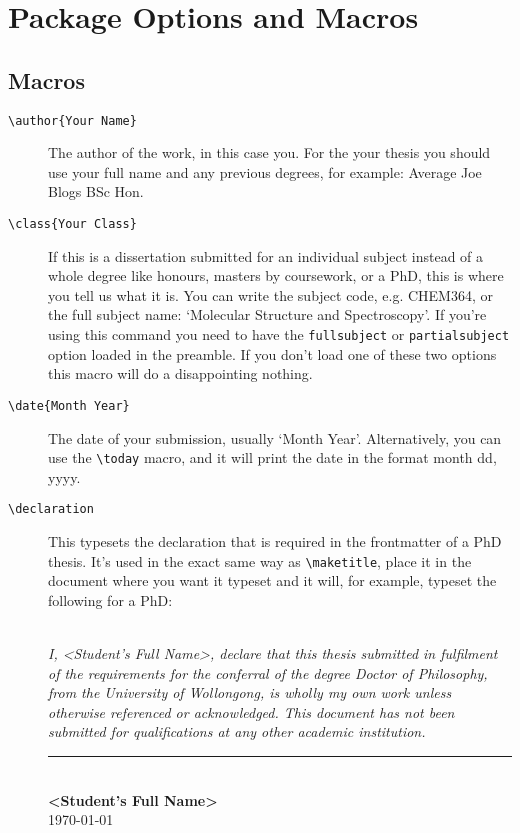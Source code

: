 \documentclass[12pt,oneside]{article}
\newcommand{\oporcom}[1]{\texttt{\color{Red}#1}} %
\newcommand{\comoptions}[1]{\texttt{\color{Green}#1}} %
\begin{document}
\section{Package Options and Macros}
\subsection*{Macros}
\begin{description}
    \item[\oporcom{\textbackslash{}author}\comoptions{\{Your Name\}}]
    The author of the work, in this case you. For the your thesis you should use your full name and any previous degrees, for example: Average Joe Blogs BSc Hon.
    
    \item[\oporcom{\textbackslash{}class}\comoptions{\{Your Class\}}] If this is a dissertation submitted for an individual subject instead of a whole degree like honours, masters by coursework, or a PhD, this is where you tell us what it is. You can write the subject code, e.g. CHEM364, or the full subject name: `Molecular Structure and Spectroscopy'. If you're using this command you need to have the \oporcom{fullsubject} or \oporcom{partialsubject} option loaded in the preamble. If you don't load one of these two options this macro will do a disappointing nothing.
    
    \item[\oporcom{\textbackslash{}date}\comoptions{\{Month Year\}}] The date of your submission, usually `Month Year'. Alternatively, you can use the \oporcom{\textbackslash{}today} macro, and it will print the date in the format month dd, yyyy.
    
    \item[\oporcom{\textbackslash{}declaration}] This typesets the declaration that is required in the frontmatter of a PhD thesis. It's used in the exact same way as \oporcom{\textbackslash{}maketitle}, place it in the document where you want it typeset and it will, for example, typeset the following for a PhD:\\
    
\\

{\itshape\noindent I, \textless{}Student's Full Name\textgreater, declare that this thesis submitted in fulfilment of the requirements for the conferral of the degree Doctor of Philosophy, from the University of Wollongong, is wholly my own work unless otherwise referenced or acknowledged. This document has not been submitted for qualifications at any other academic institution.\par
\vspace{2.9cm}
\noindent\rule{0.4\textwidth}{0.5pt}
\vspace{1ex}\\
\textbf{\textless{}Student's Full Name\textgreater}\\
\today}\\


\end{description}
\end{document}
